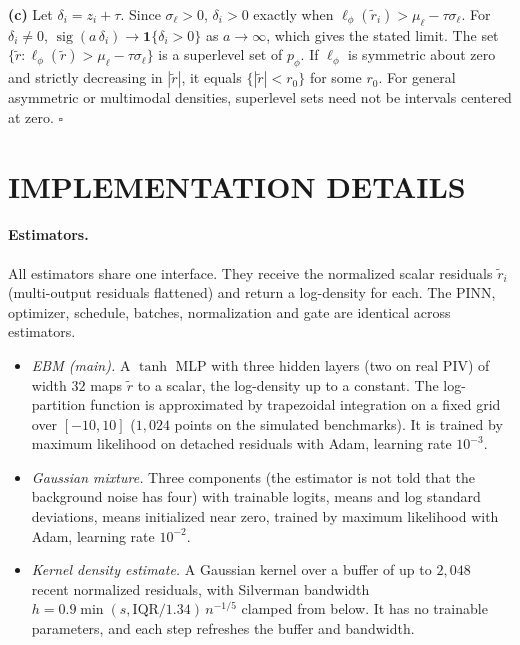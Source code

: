 \documentclass[twoside]{article}
\DeclareMathOperator{\sig}{sig}
\begin{document}
\textbf{(c)} Let $\delta_i = z_i + \tau$. Since $\sigma_\ell > 0$,
$\delta_i > 0$ exactly when $\ell_\phi(\tilde r_i) > \mu_\ell - \tau\sigma_\ell$.
For $\delta_i \neq 0$, $\sig(a\,\delta_i) \to \mathbf{1}\{\delta_i > 0\}$ as
$a \to \infty$, which gives the stated limit. The set
$\{\tilde r : \ell_\phi(\tilde r) > \mu_\ell - \tau\sigma_\ell\}$ is
a superlevel set of $p_\phi$. If $\ell_\phi$ is symmetric about zero and strictly
decreasing in $|\tilde r|$, it equals $\{|\tilde r| < r_0\}$ for some $r_0$.
For general asymmetric or multimodal densities, superlevel sets need not be
intervals centered at zero.
\hfill$\square$

\section{IMPLEMENTATION DETAILS}
\label{app:method}



\paragraph{Estimators.}
All estimators share one interface. They receive the normalized scalar residuals
$\tilde r_i$ (multi-output residuals flattened) and return a log-density for
each. The PINN, optimizer, schedule, batches, normalization and gate are
identical across estimators.
\begin{itemize}
\item \emph{EBM (main).} A $\tanh$ MLP with three hidden layers (two on real PIV) of width $32$
maps $\tilde r$ to a scalar, the log-density up to a constant. The
log-partition function is approximated by trapezoidal integration on a fixed
grid over $[-10, 10]$ ($1{,}024$ points on the simulated benchmarks). It is
trained by maximum likelihood on detached residuals with Adam, learning rate
$10^{-3}$.
\item \emph{Gaussian mixture.} Three components (the estimator is not told that
the background noise has four) with trainable
logits, means and log standard deviations, means initialized near zero,
trained by maximum likelihood with Adam, learning rate $10^{-2}$.
\item \emph{Kernel density estimate.} A Gaussian kernel over a buffer of up to
$2{,}048$ recent normalized residuals, with Silverman bandwidth
$h = 0.9\min(s, \mathrm{IQR}/1.34)\,n^{-1/5}$ clamped from below. It has no
trainable parameters, and each step refreshes the buffer and bandwidth.
\end{itemize}
\end{document}
